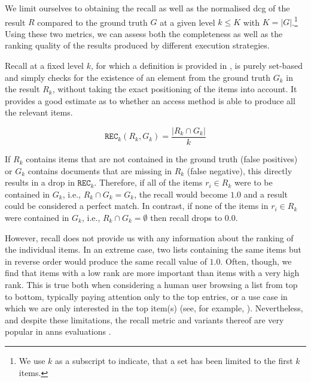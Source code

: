 We limit ourselves to obtaining the recall as well as the normalised \acrshort{dcg} \cite{Jarvelin:2002Cumulated} of the result $R$ compared to the ground truth $G$ at a given level $k \leq K$ with $K = |G|$.\footnote{We use $k$ as a subscript to indicate, that a set has been limited to the first $k$ items.} Using these two metrics, we can assess both the completeness as well as the ranking quality of the results produced by different execution strategies.

Recall at a fixed level $k$, for which a definition is provided in , is purely set-based and simply checks for the existence of an element from the ground truth $G_k$ in the result $R_k$, without taking the exact positioning of the items into account. It provides a good estimate as to whether an access method is able to produce all the relevant items.

\begin{equation}
    \label{equation:recall}
    \texttt{REC}_k (R_k, G_k) = \frac{|R_k \cap G_k |}{k}
\end{equation}

If $R_k$ contains items that are not contained in the ground truth (false positives) or $G_k$ contains documents that are missing in $R_k$ (false negative), this directly results in a drop in $\texttt{REC}_k$. Therefore, if all of the items $r_i \in R_k$ were to be contained in $G_k$, i.e., $R_k \cap G_k = G_k$, the recall would become $1.0$ and a result could be considered a perfect match. In contrast, if none of the items in $r_i \in R_k$ were contained in $G_k$, i.e., $R_k \cap G_k = \emptyset$ then recall drops to $0.0$. 

However, recall does not provide us with any information about the ranking of the individual items. In an extreme case, two lists containing the same items but in reverse order would produce the same recall value of $1.0$. Often, though, we find that items with a low rank are more important than items with a very high rank. This is true both when considering a human user browsing a list from top to bottom, typically paying attention only to the top entries, or a use case in which we are only interested in the top item(s) (see, for example, ). Nevertheless, and despite these limitations, the recall metric and variants thereof are very popular in \acrshort{anns} evaluations \cite{Aumueller:2017ANN,Simhadri:2022Results}. 

